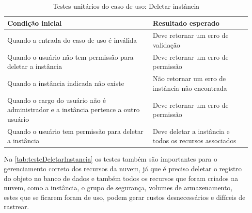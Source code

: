 \begin{table}[h]
\caption{Testes unitários do caso de uso: Deletar instância}
\label{tab:testeDeletarInstancia}
\begin{tabularx}{\textwidth}{p{} p{}}
\toprule
\textbf{Condição inicial} & \textbf{Resultado esperado} \\ \midrule

Quando a entrada do caso de uso é inválida & Deve retornar um erro de validação \\ \hline

Quando o usuário não tem permissão para deletar a instância & Deve retornar um erro de permissão \\ \hline

Quando a instância indicada não existe & Não retornar um erro de instância não encontrada \\ \hline

Quando o cargo do usuário não é administrador e a instância pertence a outro usuário & Deve retornar um erro de permissão \\ \hline

Quando o usuário tem permissão para deletar a instância & Deve deletar a instância e todos os recursos associados \\

\bottomrule
\end{tabularx}
\end{table}

Na \autoref{tab:testeDeletarInstancia} os testes também são importantes para o gerenciamento correto dos recursos da nuvem, já que é preciso deletar o registro do objeto no banco de dados e também todos os recursos que foram criados na nuvem, como a instância, o grupo de segurança, volumes de armazenamento, estes que se ficarem foram de uso, podem gerar custos desnecessários e difíceis de rastrear.


